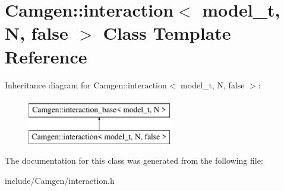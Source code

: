 \hypertarget{a00310}{\section{Camgen\-:\-:interaction$<$ model\-\_\-t, N, false $>$ Class Template Reference}
\label{a00310}
}
Inheritance diagram for Camgen\-:\-:interaction$<$ model\-\_\-t, N, false $>$\-:\begin{figure}[H]
\begin{center}
\leavevmode
\includegraphics[height=2.000000cm]{a00310}
\end{center}
\end{figure}


The documentation for this class was generated from the following file\-:\begin{DoxyCompactItemize}
\item 
include/\-Camgen/interaction.\-h\end{DoxyCompactItemize}
